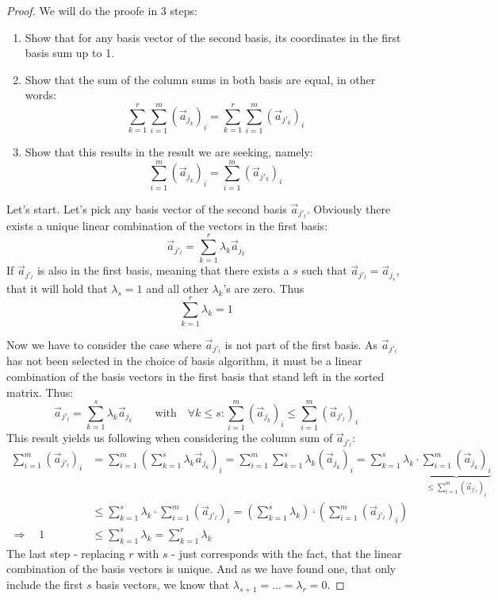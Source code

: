 \begin{proof}
    We will do the proofe in 3 steps:
    \begin{enumerate}
        \item Show that for any basis vector of the second basis, its coordinates in the first basis sum up to 1.
        \item Show that the sum of the column sums in both basis are equal, in other words:
        $$\sum_{k=1}^{r}\sum_{i=1}^{m}(\vec a_{j_k})_i = \sum_{k=1}^{r}\sum_{i=1}^{m}(\vec a_{j'_k})_i$$
        \item Show that this results in the result we are seeking, namely:
        $$\sum_{i=1}^{m}(\vec a_{j_k})_i = \sum_{i=1}^{m}(\vec a_{j'_k})_i$$
    \end{enumerate}
    Let's start. Let's pick any basis vector of the second basis $\vec a_{j'_l}$. Obviously there exists a unique linear combination of the vectors in the first basis:
    $$\vec a_{j'_l} = \sum_{k=1}^{r}\lambda_k\vec a_{j_k}$$
    If $\vec a_{j'_l}$ is also in the first basis, meaning that there exists a $s$ such that $\vec a_{j'_l} = \vec a_{j_s}$, that it will hold that $\lambda_s = 1$ and all other $\lambda_k$'s are zero. Thus
    $$\sum_{k=1}^{r}\lambda_k = 1$$

    Now we have to consider the case where $\vec a_{j'_l}$ is not part of the first basis. As $\vec a_{j'_l}$ has not been selected in the choice of basis algorithm, it must be a linear combination of the basis vectors in the first basis that stand left in the sorted matrix. Thus:
    $$\vec a_{j'_l} = \sum_{k=1}^{s}\lambda_k\vec a_{j_k} \qquad\textrm{with}\quad \forall k \leq s\colon\sum_{i=1}^{m}(\vec a_{j_k})_i \leq \sum_{i=1}^{m}(\vec a_{j'_l})_i$$
    This result yields us following when considering the column sum of $\vec a_{j'_l}$:
    \begin{align*}
        \sum_{i=1}^{m} (\vec a_{j'_l})_i &= \sum_{i=1}^{m} \left(\sum_{k=1}^{s}\lambda_k \vec a_{j_k}\right)_i = \sum_{i=1}^{m} \sum_{k=1}^{s}\lambda_k \left(\vec a_{j_k}\right)_i = \sum_{k=1}^{s} \lambda_k \cdot\underbrace{\sum_{i=1}^{m} \left(\vec a_{j_k}\right)_i}_{\leq \sum_{i=1}^{m} (\vec a_{j'_l})_i}\\
        &\leq \sum_{k=1}^{s} \lambda_k \cdot\sum_{i=1}^{m} (\vec a_{j'_l})_i = \left(\sum_{k=1}^{s} \lambda_k\right) \cdot\left(\sum_{i=1}^{m} (\vec a_{j'_l})_i\right)\\
        \Rightarrow\quad 1 &\leq \sum_{k=1}^{s} \lambda_k = \sum_{k=1}^{r} \lambda_k
    \end{align*}
    The last step - replacing $r$ with $s$ - just corresponds with the fact, that the linear combination of the basis vectors is unique. And as we have found one, that only include the first $s$ basis vectors, we know that $\lambda_{s+1} = \dots = \lambda_r = 0$.


\end{proof}
